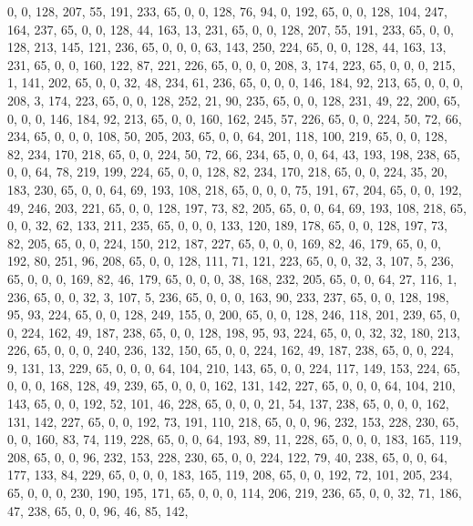 \begin{DoxyCode}
       0, 0, 128, 207, 55, 191, 233, 65, 0, 0, 128, 76, 94, 0, 192, 65, 0, 0, 128, 104, 247, 164, 237, 65, 0, 0,
       128, 44, 163, 13, 231, 65, 0, 0, 128, 207, 55, 191, 233, 65, 0, 0, 128, 213, 145, 121, 236, 65, 0, 0, 0, 63,
       143, 250, 224, 65, 0, 0, 128, 44, 163, 13, 231, 65, 0, 0, 160, 122, 87, 221, 226, 65, 0, 0, 0, 208, 3, 174,
       223, 65, 0, 0, 0, 215, 1, 141, 202, 65, 0, 0, 32, 48, 234, 61, 236, 65, 0, 0, 0, 146, 184, 92, 213, 65, 0,
       0, 0, 208, 3, 174, 223, 65, 0, 0, 128, 252, 21, 90, 235, 65, 0, 0, 128, 231, 49, 22, 200, 65, 0, 0, 0, 146,
       184, 92, 213, 65, 0, 0, 160, 162, 245, 57, 226, 65, 0, 0, 224, 50, 72, 66, 234, 65, 0, 0, 0, 108, 50, 205,
       203, 65, 0, 0, 64, 201, 118, 100, 219, 65, 0, 0, 128, 82, 234, 170, 218, 65, 0, 0, 224, 50, 72, 66, 234, 65,
       0, 0, 64, 43, 193, 198, 238, 65, 0, 0, 64, 78, 219, 199, 224, 65, 0, 0, 128, 82, 234, 170, 218, 65, 0, 0,
       224, 35, 20, 183, 230, 65, 0, 0, 64, 69, 193, 108, 218, 65, 0, 0, 0, 75, 191, 67, 204, 65, 0, 0, 192, 49, 246,
       203, 221, 65, 0, 0, 128, 197, 73, 82, 205, 65, 0, 0, 64, 69, 193, 108, 218, 65, 0, 0, 32, 62, 133, 211, 235,
       65, 0, 0, 0, 133, 120, 189, 178, 65, 0, 0, 128, 197, 73, 82, 205, 65, 0, 0, 224, 150, 212, 187, 227, 65, 0,
       0, 0, 169, 82, 46, 179, 65, 0, 0, 192, 80, 251, 96, 208, 65, 0, 0, 128, 111, 71, 121, 223, 65, 0, 0, 32, 3,
       107, 5, 236, 65, 0, 0, 0, 169, 82, 46, 179, 65, 0, 0, 0, 38, 168, 232, 205, 65, 0, 0, 64, 27, 116, 1, 236,
       65, 0, 0, 32, 3, 107, 5, 236, 65, 0, 0, 0, 163, 90, 233, 237, 65, 0, 0, 128, 198, 95, 93, 224, 65, 0, 0,
       128, 249, 155, 0, 200, 65, 0, 0, 128, 246, 118, 201, 239, 65, 0, 0, 224, 162, 49, 187, 238, 65, 0, 0, 128, 198,
       95, 93, 224, 65, 0, 0, 32, 32, 180, 213, 226, 65, 0, 0, 0, 240, 236, 132, 150, 65, 0, 0, 224, 162, 49, 187,
       238, 65, 0, 0, 224, 9, 131, 13, 229, 65, 0, 0, 0, 64, 104, 210, 143, 65, 0, 0, 224, 117, 149, 153, 224, 65,
       0, 0, 0, 168, 128, 49, 239, 65, 0, 0, 0, 162, 131, 142, 227, 65, 0, 0, 0, 64, 104, 210, 143, 65, 0, 0, 192,
       52, 101, 46, 228, 65, 0, 0, 0, 21, 54, 137, 238, 65, 0, 0, 0, 162, 131, 142, 227, 65, 0, 0, 192, 73, 191,
       110, 218, 65, 0, 0, 96, 232, 153, 228, 230, 65, 0, 0, 160, 83, 74, 119, 228, 65, 0, 0, 64, 193, 89, 11, 228,
       65, 0, 0, 0, 183, 165, 119, 208, 65, 0, 0, 96, 232, 153, 228, 230, 65, 0, 0, 224, 122, 79, 40, 238, 65, 0,
       0, 64, 177, 133, 84, 229, 65, 0, 0, 0, 183, 165, 119, 208, 65, 0, 0, 192, 72, 101, 205, 234, 65, 0, 0, 0,
       230, 190, 195, 171, 65, 0, 0, 0, 114, 206, 219, 236, 65, 0, 0, 32, 71, 186, 47, 238, 65, 0, 0, 96, 46, 85, 142,

\end{DoxyCode}
